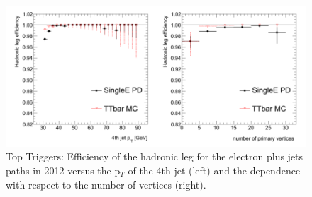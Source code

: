 \begin{figure} 
\includegraphics[width=\textwidth]{Figures/SemiLeptTriggerEfficiencies.png}
\caption{Top Triggers: Efficiency of the hadronic leg for the electron plus jets paths in 2012 versus the p$_T$ of the 4th jet (left) and the dependence with respect to the number of vertices (right). \cite{CMSTriggerPerformance}}
\label{fig-SemiLeptEfficiencies}
\end{figure}
